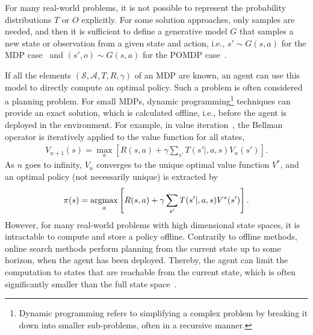 

For many real-world problems, it is not possible to represent the probability distributions $T$ or $O$ explicitly. For some solution approaches, only samples are needed, and then it is sufficient to define a generative model $G$ that samples a new state or observation from a given state and action, i.e., $s' \sim G(s,a)$ for the MDP case~\cite[Ch. 4]{Kochenderfer2015} and $(s', o) \sim G(s,a)$ for the POMDP case~\cite[Ch. 6]{Kochenderfer2015}.




If all the elements $( \mathcal{S}, \mathcal{A}, T, R, \gamma )$ of an MDP are known, an agent can use this model to directly compute an optimal policy. Such a problem is often considered a planning problem. For small MDPs, dynamic programming\footnote{Dynamic programming refers to simplifying a complex problem by breaking it down into smaller sub-problems, often in a recursive manner.} techniques can provide an exact solution, which is calculated offline, i.e., before the agent is deployed in the environment. For example, in value iteration~\cite[Ch. 4]{Kochenderfer2015}, the Bellman operator is iteratively applied to the value function for all states,
%
\begin{align}
    V_{n+1}(s) = \max_a \left[ R(s,a) + \gamma \sum_{s'}T(s'|,a,s)V_n(s') \right].
\end{align}
%
As $n$ goes to infinity, $V_n$ converges to the unique optimal value function $V^*$, and an optimal policy (not necessarily unique) is extracted by
%
\begin{align}
    \pi(s) = \operatorname*{argmax}_a \left[ R(s,a) + \gamma \sum_{s'}T(s'|,a,s)V^*(s') \right].
\end{align}
%
However, for many real-world problems with high dimensional state spaces, it is intractable to compute and store a policy offline. Contrarily to offline methods, online search methods perform planning from the current state up to some horizon, when the agent has been deployed. Thereby, the agent can limit the computation to states that are reachable from the current state, which is often significantly smaller than the full state space~\cite[Ch. 4]{Kochenderfer2015}.

